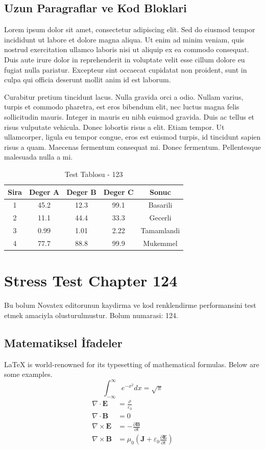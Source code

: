 \documentclass[12pt,a4paper]{article}
\begin{document}
\subsection{Uzun Paragraflar ve Kod Bloklari}
Lorem ipsum dolor sit amet, consectetur adipiscing elit. Sed do eiusmod tempor incididunt ut labore et dolore magna aliqua. Ut enim ad minim veniam, quis nostrud exercitation ullamco laboris nisi ut aliquip ex ea commodo consequat. Duis aute irure dolor in reprehenderit in voluptate velit esse cillum dolore eu fugiat nulla pariatur. Excepteur sint occaecat cupidatat non proident, sunt in culpa qui officia deserunt mollit anim id est laborum.

Curabitur pretium tincidunt lacus. Nulla gravida orci a odio. Nullam varius, turpis et commodo pharetra, est eros bibendum elit, nec luctus magna felis sollicitudin mauris. Integer in mauris eu nibh euismod gravida. Duis ac tellus et risus vulputate vehicula. Donec lobortis risus a elit. Etiam tempor. Ut ullamcorper, ligula eu tempor congue, eros est euismod turpis, id tincidunt sapien risus a quam. Maecenas fermentum consequat mi. Donec fermentum. Pellentesque malesuada nulla a mi.

\begin{table}[h!]
\centering
\begin{tabular}{|c|c|c|c|c|}
\hline
\textbf{Sira} & \textbf{Deger A} & \textbf{Deger B} & \textbf{Deger C} & \textbf{Sonuc} \\
\hline
1 & 45.2 & 12.3 & 99.1 & Basarili \\
2 & 11.1 & 44.4 & 33.3 & Gecerli \\
3 & 0.99 & 1.01 & 2.22 & Tamamlandi \\
4 & 77.7 & 88.8 & 99.9 & Mukemmel \\
\hline
\end{tabular}
\caption{Test Tablosu - 123}
\end{table}

\newpage
\section{Stress Test Chapter 124}
Bu bolum Novatex editorunun kaydirma ve kod renklendirme performansini test etmek amaciyla olusturulmustur. Bolum numarasi: 124.

\subsection{Matematiksel İfadeler}
\LaTeX{} is world-renowned for its typesetting of mathematical formulas. Below are some examples.
\begin{equation}
\int_{-\infty}^{\infty} e^{-x^2} dx = \sqrt{\pi}
\end{equation}
\begin{align}
\nabla \cdot \mathbf{E} &= \frac{\rho}{\varepsilon_0} \\
\nabla \cdot \mathbf{B} &= 0 \\
\nabla \times \mathbf{E} &= -\frac{\partial \mathbf{B}}{\partial t} \\
\nabla \times \mathbf{B} &= \mu_0\left(\mathbf{J} + \varepsilon_0 \frac{\partial \mathbf{E}}{\partial t}\right)
\end{align}
\end{document}
